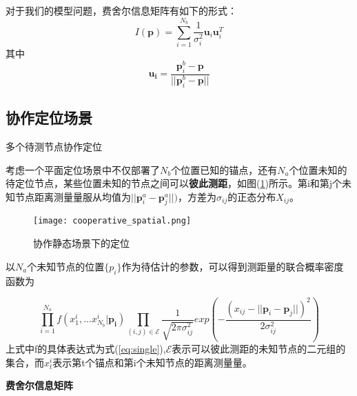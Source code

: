 对于我们的模型问题，费舍尔信息矩阵有如下的形式：
\begin{equation}\label{eq:uu}
I(\bm{p})=\displaystyle\sum_{i=1}^{N_b}\frac{1}{\sigma_i^2}\bm{u}_i\bm{u}_i^T
\end{equation}
其中
\begin{equation}
\bm{u_i}=\frac{\bm{p}^b_i-\bm{p}}{||\bm{p}^b_i-\bm{p}||}
\end{equation}


\subsection[协作定位场景]{协作定位场景}\label{subsection:cooperative_localization}

多个待测节点协作定位

考虑一个平面定位场景中不仅部署了$N_b$个位置已知的锚点，还有$N_a$个位置未知的待定位节点，某些位置未知的节点之间可以\textbf{彼此测距}，如图(\ref{fig:cooperative_spatial})所示。第i和第j个未知节点距离测量量服从均值为$||\bm{p}^a_i-\bm{p}^a_j||)$，方差为$\sigma_{ij}$的正态分布$X_{ij}$。
        \begin{figure}
          \centering
          \texttt{[image: cooperative\_spatial.png]}
          \caption{协作静态场景下的定位}\label{fig:cooperative_spatial}
        \end{figure}

以$N_a$个未知节点的位置$\{p_i\}$作为待估计的参数，可以得到测距量的联合概率密度函数为

\begin{equation}
\prod_{i=1}^{N_a} f(x^i_1,...x^{i}_{N_b}|\bm{p_i})\prod_{(i,j)\in \mathcal{E}}\frac{1}{\sqrt{2\pi\sigma_{ij}^2}}exp(-\frac{(x_{ij}-||\bm{p}_i-\bm{p}_j||)^2}{2\sigma_{ij}^2})
\end{equation}
上式中f的具体表达式为式(\ref{eq:single}),$\mathcal{E}$表示可以彼此测距的未知节点的二元组的集合，而$x_t^i$表示第t个锚点和第i个未知节点的距离测量量。

\textbf{费舍尔信息矩阵}


